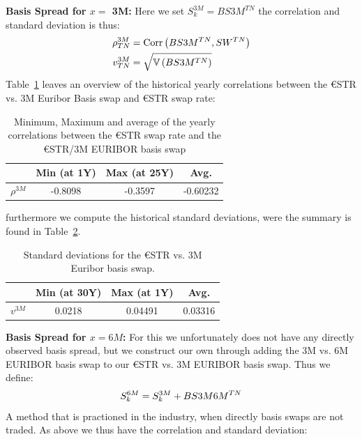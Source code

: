 \documentclass[12pt]{article}
\begin{document}
\textbf{Basis Spread for $x = $ 3M:}\newline
Here we set $S_k^{3M} = BS3M^{TN}$ the correlation and standard deviation
is thus:
\begin{equation}
    \notag \begin{aligned}
        \rho^{3M}_{TN} &= \text{Corr} \left(BS3M^{TN} , SW^{TN}  \right)
    \\ v^{3M}_{TN} & = \sqrt{\mathbb{V} \left( BS3M^{TN} \right)}
    \end{aligned}
\end{equation}
Table~\ref{tab:Corr3MBasis} leaves an overview of the historical
yearly correlations between the €STR vs. 3M Euribor Basis swap
and €STR swap rate:
\begin{table}[H]
    \centering
    \begin{tabular}{|c|c|c|c|}
    \hline
    & Min (at 1Y) & Max (at 25Y) & Avg. \\ \hline \hline
    $\rho^{3M}$ & -0.8098&   -0.3597& -0.60232 \\ \hline
    \end{tabular}
    \caption{Minimum, Maximum and average of the
    yearly correlations between the €STR swap rate
    and the €STR/3M EURIBOR basis swap}
    \label{tab:Corr3MBasis}
\end{table}
furthermore we compute the historical standard deviations,
were the summary is found in
Table~\ref{tab:Var3MBasis}.
\begin{table}[H]
    \centering
    \begin{tabular}{|c|c|c|c|}
    \hline
        & Min (at 30Y) & Max (at 1Y) & Avg.  \\ \hline \hline
      $v^{3M}$ & 0.0218 & 0.04491 & 0.03316  \\ \hline
    \end{tabular}
    \caption{Standard deviations for the €STR vs. 3M Euribor
    basis swap.}
    \label{tab:Var3MBasis}
\end{table}
\textbf{Basis Spread for $x = 6M$:}\newline
For this we unfortunately does not have
any directly observed basis spread, but we construct our
own through adding the 3M vs. 6M EURIBOR basis swap to
our €STR vs. 3M EURIBOR basis swap. Thus we define:
\begin{equation}
    \notag S^{6M}_k = S_k^{3M} + BS3M6M^{TN}
\end{equation}
A method that is practioned in the industry,
when directly basis swaps are not traded.
As above we thus have the correlation and standard deviation:
\end{document}
